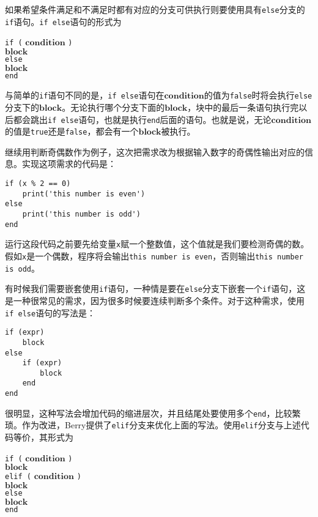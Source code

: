 如果希望条件满足和不满足时都有对应的分支可供执行则要使用具有\texttt{else}分支的\texttt{if}语句。\texttt{if else}语句的形式为
\begin{algorithm}
    \texttt{if (} $\bm{condition}$ \texttt{)} \\
        \qquad $\bm{block}$ \\
    \texttt{else} \\
        \qquad $\bm{block}$ \\
    \texttt{end}
\end{algorithm}\vspace{-0.6em}
与简单的\texttt{if}语句不同的是，\texttt{if else}语句在$\bm{condition}$的值为\texttt{false}时将会执行\texttt{else}分支下的$\bm{block}$。无论执行哪个分支下面的$\bm{block}$，块中的最后一条语句执行完以后都会跳出\texttt{if else}语句，也就是执行\texttt{end}后面的语句。也就是说，无论$\bm{condition}$的值是\texttt{true}还是\texttt{false}，都会有一个$\bm{block}$被执行。

继续用判断奇偶数作为例子，这次把需求改为根据输入数字的奇偶性输出对应的信息。实现这项需求的代码是：
\begin{lstlisting}[language=berry, numbers=none]
if (x % 2 == 0)
    print('this number is even')
else
    print('this number is odd')
end
\end{lstlisting}
运行这段代码之前要先给变量\texttt{x}赋一个整数值，这个值就是我们要检测奇偶的数。假如\texttt{x}是一个偶数，程序将会输出\texttt{this number is even}，否则输出\texttt{this number is odd}。

有时候我们需要嵌套使用\texttt{if}语句，一种情是要在\texttt{else}分支下嵌套一个\texttt{if}语句，这是一种很常见的需求，因为很多时候要连续判断多个条件。对于这种需求，使用\texttt{if else}语句的写法是：
\begin{lstlisting}[language=berry, numbers=none]
if (expr)
    block
else
    if (expr)
        block
    end
end
\end{lstlisting}
很明显，这种写法会增加代码的缩进层次，并且结尾处要使用多个\texttt{end}，比较繁琐。作为改进，Berry提供了\texttt{elif}分支来优化上面的写法。使用\texttt{elif}分支与上述代码等价，其形式为
\begin{algorithm}
    \texttt{if (} $\bm{condition}$ \texttt{)} \\
        \qquad $\bm{block}$ \\
    \texttt{elif (} $\bm{condition}$ \texttt{)} \\
        \qquad $\bm{block}$ \\
    \texttt{else} \\
    \qquad $\bm{block}$ \\
    \texttt{end}
\end{algorithm}\vspace{-0.6em}

